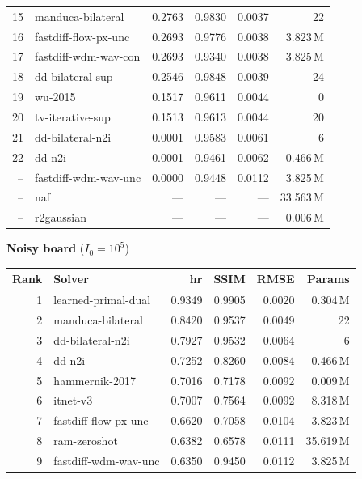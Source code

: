 \documentclass[AMA,twocolumn]{USG} %
\begin{document}
\begin{table}[t]
\begin{minipage}[t]{0.49\textwidth}
\begin{tabular}{@{}rlrrrr@{}}
15 & manduca-bilateral    & 0.2763 & 0.9830 & 0.0037 & 22 \\
16 & fastdiff-flow-px-unc & 0.2693 & 0.9776 & 0.0038 & 3.823\,M \\
17 & fastdiff-wdm-wav-con & 0.2693 & 0.9340 & 0.0038 & 3.825\,M \\
18 & dd-bilateral-sup     & 0.2546 & 0.9848 & 0.0039 & 24 \\
19 & wu-2015              & 0.1517 & 0.9611 & 0.0044 & 0 \\
20 & tv-iterative-sup     & 0.1513 & 0.9613 & 0.0044 & 20 \\
21 & dd-bilateral-n2i     & 0.0001 & 0.9583 & 0.0061 & 6 \\
22 & dd-n2i               & 0.0001 & 0.9461 & 0.0062 & 0.466\,M \\
-- & fastdiff-wdm-wav-unc & 0.0000 & 0.9448 & 0.0112 & 3.825\,M \\
-- & naf                  & ---    & ---    & ---    & 33.563\,M \\
-- & r2gaussian           & ---    & ---    & ---    & 0.006\,M \\
\bottomrule
\end{tabular}
\end{minipage}\hfill
\begin{minipage}[t]{0.49\textwidth}
\centering
\textbf{Noisy board} ($I_0=10^5$)\\[2pt]
\begin{tabular}{@{}rlrrrr@{}}
\toprule
\textbf{Rank} & \textbf{Solver} & \textbf{hr} & \textbf{SSIM} & \textbf{RMSE} & \textbf{Params} \\
\midrule
1  & learned-primal-dual  & 0.9349 & 0.9905 & 0.0020 & 0.304\,M \\
2  & manduca-bilateral    & 0.8420 & 0.9537 & 0.0049 & 22 \\
3  & dd-bilateral-n2i     & 0.7927 & 0.9532 & 0.0064 & 6 \\
4  & dd-n2i               & 0.7252 & 0.8260 & 0.0084 & 0.466\,M \\
5  & hammernik-2017       & 0.7016 & 0.7178 & 0.0092 & 0.009\,M \\
6  & itnet-v3             & 0.7007 & 0.7564 & 0.0092 & 8.318\,M \\
7  & fastdiff-flow-px-unc & 0.6620 & 0.7058 & 0.0104 & 3.823\,M \\
8  & ram-zeroshot         & 0.6382 & 0.6578 & 0.0111 & 35.619\,M \\
9  & fastdiff-wdm-wav-unc & 0.6350 & 0.9450 & 0.0112 & 3.825\,M \\

\end{tabular}
\end{minipage}
\end{table}
\end{document}
